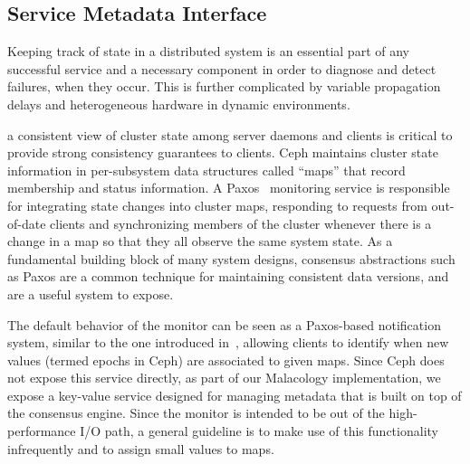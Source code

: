 \subsection{Service Metadata Interface}
\label{sec:mon}
\label{sec:service-metadata-interface}
\label{service-metadata}

Keeping track of state in a distributed system is an essential part of any
successful service and a necessary component in order to diagnose and detect
failures, when they occur. This is further complicated by variable propagation
delays and heterogeneous hardware in dynamic environments.

a consistent view of cluster state among server daemons and
clients is critical to provide strong consistency guarantees to clients.  Ceph
maintains cluster state information in per-subsystem  data structures called
``maps'' that record membership and status information.  A
Paxos~\cite{lamport_parttime_1998} monitoring service is responsible for
integrating state changes into cluster maps, responding to requests from
out-of-date clients and synchronizing members of the cluster whenever there is
a change in a map so that they all observe the same system state. As a
fundamental building block of many system designs, consensus abstractions such
as Paxos are a common technique for maintaining consistent data versions, and
are a useful system to expose.

The default behavior of the monitor can be seen as a Paxos-based notification
system, similar to the one introduced in~\cite{burrows_chubby_2006}, allowing
clients to identify when new values (termed epochs in Ceph) are associated to
given maps.  Since Ceph does not expose this service directly, as part of our
Malacology implementation, we expose a key-value service designed for managing
  metadata that is built on
top of the consensus engine. Since the monitor is intended to be out of the
high-performance I/O path, a general guideline is to make use of this
functionality infrequently and to assign small values to maps.\\

